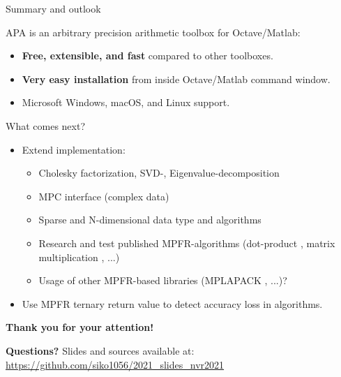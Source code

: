 \begin{frame}{Summary and outlook}

APA is an arbitrary precision arithmetic toolbox for Octave/Matlab:

\begin{itemize}\itemsep0.5em
\item
\textbf{Free, extensible, and fast} compared to other toolboxes.

\item
\textbf{Very easy installation} from inside Octave/Matlab command window.

\item
Microsoft Windows, macOS, and Linux support.
\end{itemize}

\bigskip

What comes next?
\begin{itemize}\itemsep0.5em
\item
Extend implementation:
\begin{itemize}
\item
Cholesky factorization, SVD-, Eigenvalue-decomposition

\item
MPC interface (complex data)

\item
Sparse and N-dimensional data type and algorithms

\item
Research and test published MPFR-algorithms
(dot-product \cite{Isupov2020}, matrix multiplication \cite{Kouya2016}, ...)

\item
Usage of other MPFR-based libraries (MPLAPACK \cite{Nakata2021}, ...)?
\end{itemize}

\item
Use MPFR ternary return value to detect accuracy loss in algorithms.
\end{itemize}
\end{frame}


\begin{frame}
\begin{center}
\textbf{\Large Thank you for your attention!}

\bigskip

\bigskip

\textbf{\Large Questions?}
\vfill\footnotesize
Slides and sources available at:
{\color{DarkBlue}\url{https://github.com/siko1056/2021_slides_nvr2021}}
\end{center}
\end{frame}
